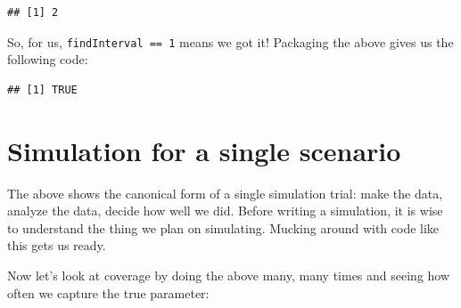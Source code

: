 \documentclass[
]{book}
\newenvironment{Shaded}{\begin{snugshade}}{\end{snugshade}}
\newcommand{\AttributeTok}[1]{\textcolor[rgb]{0.77,0.63,0.00}{#1}}
\newcommand{\CommentTok}[1]{\textcolor[rgb]{0.56,0.35,0.01}{\textit{#1}}}
\newcommand{\DecValTok}[1]{\textcolor[rgb]{0.00,0.00,0.81}{#1}}
\newcommand{\FunctionTok}[1]{\textcolor[rgb]{0.00,0.00,0.00}{#1}}
\newcommand{\NormalTok}[1]{#1}
\newcommand{\OtherTok}[1]{\textcolor[rgb]{0.56,0.35,0.01}{#1}}
\newcommand{\SpecialCharTok}[1]{\textcolor[rgb]{0.00,0.00,0.00}{#1}}
\begin{document}
\begin{verbatim}
## [1] 2
\end{verbatim}

So, for us, \texttt{findInterval\ ==\ 1} means we got it! Packaging the above gives
us the following code:

\begin{Shaded}
\end{Shaded}

\begin{verbatim}
## [1] TRUE
\end{verbatim}

\hypertarget{simulation-for-a-single-scenario}{%
\section{Simulation for a single scenario}\label{simulation-for-a-single-scenario}}

The above shows the canonical form of a single simulation trial: make the
data, analyze the data, decide how well we did.
Before writing a simulation, it is wise to understand the thing we plan on simulating.
Mucking around with code like this gets us ready.

Now let's look at coverage by doing the above many, many times and seeing how
often we capture the true parameter:

\begin{Shaded}
\end{Shaded}
\end{document}
